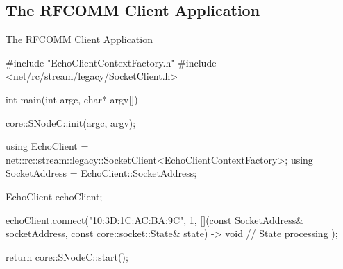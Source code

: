 ﻿\subsection{The RFCOMM Client Application}

\begin{frame}[fragile]{The RFCOMM Client Application}
  \begin{cppcode}[autogobble=true, caption={RFCOMM client application.},captionpos=b, morekeywords={[2]{SocketClient,EchoClientContextFactory,connect}}]
    #include "EchoClientContextFactory.h"
    #include <net/rc/stream/legacy/SocketClient.h>

    int main(int argc, char* argv[]) {
        core::SNodeC::init(argc, argv);

        using EchoClient = net::rc::stream::legacy::SocketClient<EchoClientContextFactory>;
        using SocketAddress = EchoClient::SocketAddress;

        EchoClient echoClient;

        echoClient.connect("10:3D:1C:AC:BA:9C", 1, [](const SocketAddress& socketAddress,
                                                      const core::socket::State& state) -> void {
            // State processing
        });

        return core::SNodeC::start();
    }
  \end{cppcode}
\end{frame}
